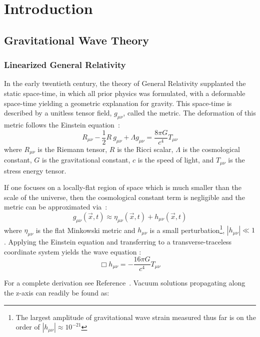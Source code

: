 \documentclass [12pt, proquest]{uwthesis}[2019]
\begin{document}
\chapter{Introduction}
\section{Gravitational Wave Theory}

\subsection{Linearized General Relativity}

In the early twentieth century, the theory of General Relativity supplanted the static space-time, in which all prior physics was formulated, with a deformable space-time yielding a geometric explanation for gravity. This space-time is described by a unitless tensor field, $g_{\mu \nu}$, called the metric. The deformation of this metric follows the Einstein equation~\cite{einsteinGR}:
\begin{equation}
R_{\mu \nu}-\frac{1}{2}R\ g_{\mu \nu}+\Lambda g_{\mu \nu}= \frac{8\pi G}{c^4} T_{\mu \nu}
\end{equation}
where $R_{\mu \nu}$ is the Riemann tensor, $R$ is the Ricci scalar, $\Lambda$ is the cosmological constant, $G$ is the gravitational constant, $c$ is the speed of light, and $T_{\mu \nu}$ is the stress energy tensor.

If one focuses on a locally-flat region of space which is much smaller than the scale of the universe, then the cosmological constant term is negligible and the metric can be approximated via~\cite{GWBook}:
\begin{equation}
g_{\mu \nu}(\vec x,t)\approx\eta_{\mu \nu}(\vec x,t)+h_{\mu \nu}(\vec x,t)
\end{equation}
where $\eta_{\mu \nu}$ is the flat Minkowski metric and $h_{\mu \nu}$ is a small perturbation\footnote{The largest amplitude of gravitational wave strain measured thus far is on the order of $|h_{\mu \nu}|\approx 10^{-21}$\cite{GW150914}}, $|h_{\mu \nu}|\ll 1$. Applying the Einstein equation and transferring to a transverse-traceless coordinate system yields the wave equation \cite{einsteinGW}:
\begin{equation}
\Box h_{\mu \nu}=-\frac{16 \pi G}{c^4}T_{\mu \nu}
\end{equation}

For a complete derivation see Reference~\cite{GWBook}. Vacuum solutions propagating along the z-axis can readily be found as:
\end{document}
